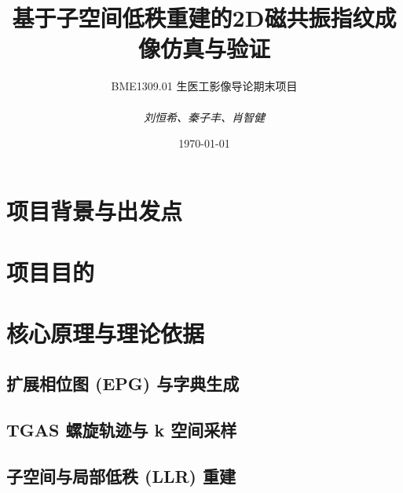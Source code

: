 \documentclass[a4paper, 11pt]{ctexart}
\title{基于子空间低秩重建的2D磁共振指纹成像仿真与验证}
\author{BME1309.01 生医工影像导论期末项目 \\ \\ \textit{刘恒希、秦子丰、肖智健}}
\date{\today}
\begin{document}
\maketitle

\begin{abstract}
\end{abstract}

\newpage
\tableofcontents
\newpage


\section{项目背景与出发点}

\section{项目目的}

\section{核心原理与理论依据}
\subsection{扩展相位图 (EPG) 与字典生成}
\subsection{TGAS 螺旋轨迹与 k 空间采样}
\subsection{子空间与局部低秩 (LLR) 重建}
\end{document}
